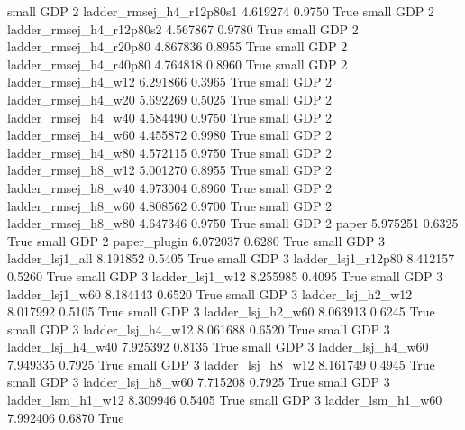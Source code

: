      small      GDP                 2 ladder_rmsej_h4_r12p80s1   4.619274      0.9750    True
     small      GDP                 2 ladder_rmsej_h4_r12p80s2   4.567867      0.9780    True
     small      GDP                 2   ladder_rmsej_h4_r20p80   4.867836      0.8955    True
     small      GDP                 2   ladder_rmsej_h4_r40p80   4.764818      0.8960    True
     small      GDP                 2      ladder_rmsej_h4_w12   6.291866      0.3965    True
     small      GDP                 2      ladder_rmsej_h4_w20   5.692269      0.5025    True
     small      GDP                 2      ladder_rmsej_h4_w40   4.584490      0.9750    True
     small      GDP                 2      ladder_rmsej_h4_w60   4.455872      0.9980    True
     small      GDP                 2      ladder_rmsej_h4_w80   4.572115      0.9750    True
     small      GDP                 2      ladder_rmsej_h8_w12   5.001270      0.8955    True
     small      GDP                 2      ladder_rmsej_h8_w40   4.973004      0.8960    True
     small      GDP                 2      ladder_rmsej_h8_w60   4.808562      0.9700    True
     small      GDP                 2      ladder_rmsej_h8_w80   4.647346      0.9750    True
     small      GDP                 2                    paper   5.975251      0.6325    True
     small      GDP                 2             paper_plugin   6.072037      0.6280    True
     small      GDP                 3          ladder_lsj1_all   8.191852      0.5405    True
     small      GDP                 3       ladder_lsj1_r12p80   8.412157      0.5260    True
     small      GDP                 3          ladder_lsj1_w12   8.255985      0.4095    True
     small      GDP                 3          ladder_lsj1_w60   8.184143      0.6520    True
     small      GDP                 3        ladder_lsj_h2_w12   8.017992      0.5105    True
     small      GDP                 3        ladder_lsj_h2_w60   8.063913      0.6245    True
     small      GDP                 3        ladder_lsj_h4_w12   8.061688      0.6520    True
     small      GDP                 3        ladder_lsj_h4_w40   7.925392      0.8135    True
     small      GDP                 3        ladder_lsj_h4_w60   7.949335      0.7925    True
     small      GDP                 3        ladder_lsj_h8_w12   8.161749      0.4945    True
     small      GDP                 3        ladder_lsj_h8_w60   7.715208      0.7925    True
     small      GDP                 3        ladder_lsm_h1_w12   8.309946      0.5405    True
     small      GDP                 3        ladder_lsm_h1_w60   7.992406      0.6870    True
